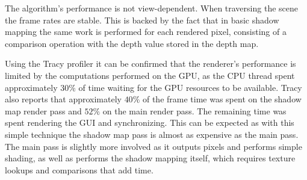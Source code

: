 The algorithm's performance is not view-dependent. When traversing the scene the frame rates are stable. This is backed by the fact that in basic shadow mapping the same work is performed for each rendered pixel, consisting of a comparison operation with the depth value stored in the depth map.

Using the Tracy profiler it can be confirmed that the renderer's performance is limited by the computations performed on the GPU, as the CPU thread spent approximately \(30\%\) of time waiting for the GPU resources to be available. Tracy also reports that approximately \(40\%\) of the frame time was spent on the shadow map render pass and \(52\%\) on the main render pass. The remaining time was spent rendering the GUI and synchronizing. This can be expected as with this simple technique the shadow map pass is almost as expensive as the main pass. The main pass is slightly more involved as it outputs pixels and performs simple shading, as well as performs the shadow mapping itself, which requires texture lookups and comparisons that add time.

